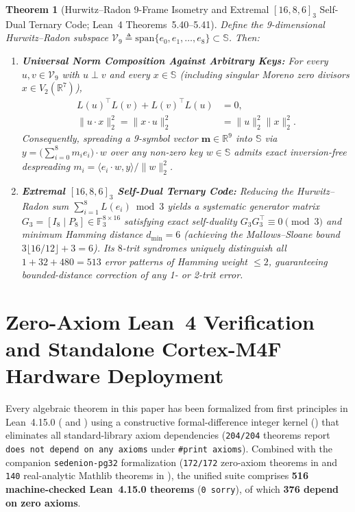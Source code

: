 \documentclass[journal,twoside]{IEEEtran}
\newtheorem{theorem}{Theorem}
\theoremstyle{definition}
\theoremstyle{remark}
\newcommand{\R}{\mathbb{R}}
\newcommand{\Se}{\mathbb{S}}
\newcommand{\Fthree}{\mathbb{F}_3}
\begin{document}
\begin{theorem}[{Hurwitz--Radon 9-Frame Isometry and Extremal $[16, 8, 6]_3$ Self-Dual Ternary Code; Lean~4 Theorems~5.40--5.41}]
\label{thm:hurwitz_radon}
Define the 9-dimensional Hurwitz--Radon subspace $\mathcal{V}_9 \triangleq \mathrm{span}\{e_0, e_1, \dots, e_8\} \subset \Se$. Then:
\begin{enumerate}
    \item \textbf{Universal Norm Composition Against Arbitrary Keys:} For every $u, v \in \mathcal{V}_9$ with $u \perp v$ and \emph{every} $x \in \Se$ (including singular Moreno zero divisors $x \in V_2(\R^7)$),
    \begin{equation}
    \begin{aligned}
        L(u)^\top L(v) + L(v)^\top L(u) &= 0, \\
        \|u \cdot x\|_2^2 = \|x \cdot u\|_2^2 &= \|u\|_2^2 \|x\|_2^2.
    \end{aligned}
    \label{eq:hr9_isometry}
    \end{equation}
    Consequently, spreading a 9-symbol vector $\bm{m} \in \R^9$ into $\Se$ via $y = \bigl(\sum_{i=0}^8 m_i e_i\bigr)\cdot w$ over any non-zero key $w \in \Se$ admits exact inversion-free despreading $m_i = \langle e_i \cdot w, y\rangle / \|w\|_2^2$.
    \item \textbf{Extremal $[16, 8, 6]_3$ Self-Dual Ternary Code:} Reducing the Hurwitz--Radon sum $\sum_{i=1}^8 L(e_i) \bmod 3$ yields a systematic generator matrix $G_3 = [I_8 \mid P_8] \in \Fthree^{8 \times 16}$ satisfying exact self-duality $G_3 G_3^\top \equiv 0 \pmod 3$ and minimum Hamming distance $d_{\min} = 6$ (achieving the Mallows--Sloane bound $3\lfloor 16/12\rfloor + 3 = 6$). Its $8$-trit syndromes uniquely distinguish all $1 + 32 + 480 = 513$ error patterns of Hamming weight $\le 2$, guaranteeing bounded-distance correction of any 1- or 2-trit error.
\end{enumerate}
\end{theorem}

\section{Zero-Axiom Lean~4 Verification and Standalone Cortex-M4F Hardware Deployment}
\label{sec:verification}
Every algebraic theorem in this paper has been formalized from first principles in Lean~4.15.0 ( and ) using a constructive formal-difference integer kernel () that eliminates all standard-library axiom dependencies (\texttt{204/204} theorems report \texttt{does not depend on any axioms} under \texttt{\#print axioms}). Combined with the companion \texttt{sedenion-pg32} formalization (\texttt{172/172} zero-axiom theorems in  and \texttt{140} real-analytic Mathlib theorems in  \cite{Agourakis2026PG32}), the unified suite comprises \textbf{516 machine-checked Lean~4.15.0 theorems} (\texttt{0 sorry}), of which \textbf{376 depend on zero axioms}.
\end{document}
